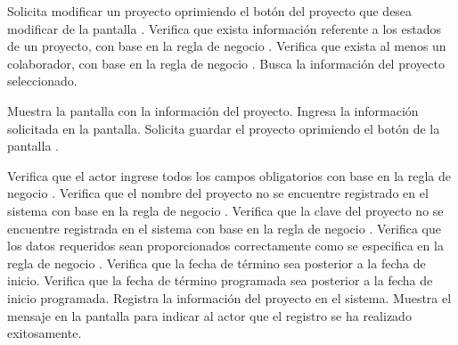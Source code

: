 	 \begin{UCtrayectoria}
    \UCpaso[\UCactor] Solicita modificar un proyecto oprimiendo el botón \btnEditar del proyecto que desea modificar de la pantalla .
	    \UCpaso[\UCsist] Verifica que exista información referente a los estados de un proyecto, con base en la regla de negocio . 
	    \UCpaso[\UCsist] Verifica que exista al menos un colaborador, con base en la regla de negocio . 
	    \UCpaso[\UCsist] Busca la información del proyecto seleccionado.
		
	    \UCpaso[\UCsist] Muestra la pantalla  con la información del proyecto.
	    \UCpaso[\UCactor] Ingresa la información solicitada en la pantalla. \label{cu1.2:ingresaDatos}
	    \UCpaso[\UCactor] Solicita guardar el proyecto oprimiendo el botón  de la pantalla .  
    
	    \UCpaso[\UCsist] Verifica que el actor ingrese todos los campos obligatorios con base en la regla de negocio  . 
	    \UCpaso[\UCsist] Verifica que el nombre del proyecto no se encuentre registrado en el sistema con base en la regla de negocio  . 
	    \UCpaso[\UCsist] Verifica que la clave del proyecto no se encuentre registrada en el sistema con base en la regla de negocio  . 
	    \UCpaso[\UCsist] Verifica que los datos requeridos sean proporcionados correctamente como se especifica en la regla de negocio .  
	    \UCpaso[\UCsist] Verifica que la fecha de término sea posterior a la fecha de inicio. 
	    \UCpaso[\UCsist] Verifica que la fecha de término programada sea posterior a la fecha de inicio programada. 
	    \UCpaso[\UCsist] Registra la información del proyecto en el sistema.
	    \UCpaso[\UCsist] Muestra el mensaje  en la pantalla 
	    para indicar al actor que el registro se ha realizado exitosamente.
	 \end{UCtrayectoria}

